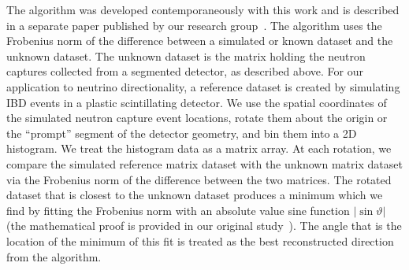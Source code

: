 \documentclass[tightenlines,twocolumn,prl,notitlepage,nofootinbib,preprintnumbers,longbibliography]{revtex4-1}
\begin{document}
The algorithm was developed contemporaneously with this work and is described in a separate paper published by our research group~\cite{10.1063/5.0315079}. 
The algorithm uses the Frobenius norm of the difference between a simulated or known dataset and the unknown dataset. 
The unknown dataset is the matrix holding the neutron captures collected from a segmented detector, as described above. 
For our application to neutrino directionality, a reference dataset is created by simulating IBD events in a plastic scintillating detector. 
We use the spatial coordinates of the simulated neutron capture event locations, rotate them about the origin or the ``prompt'' segment of the detector geometry, and bin them into a 2D histogram. 
We treat the histogram data as a matrix array. 
At each rotation, we compare the simulated reference matrix dataset with the unknown matrix dataset via the Frobenius norm of the difference between the two matrices. 
The rotated dataset that is closest to the unknown dataset produces a minimum which we find by fitting the Frobenius norm with an absolute value sine function $|\sin \vartheta|$ (the mathematical proof is provided in our original study~\cite{10.1063/5.0315079}).
The angle that is the location of the minimum of this fit is treated as the best reconstructed direction from the algorithm.
\end{document}
